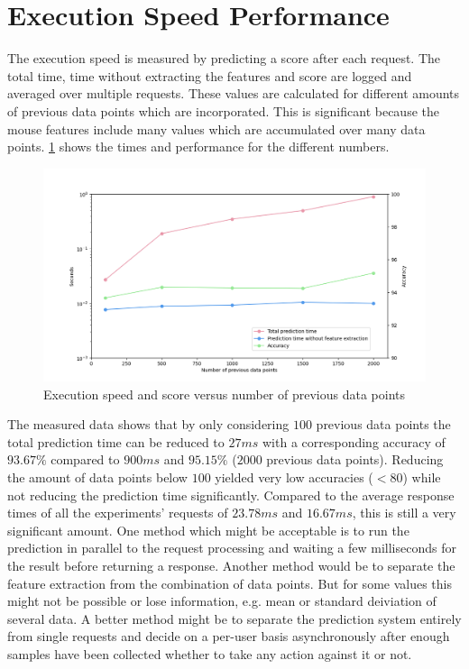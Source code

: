 \documentclass[
    fontsize=12pt,
    headings=small,
    parskip=half,           %
    bibliography=totoc,
    numbers=noenddot,       %
    open=any,               %
    final,                   %
    table
]{scrreprt}
\begin{document}
\section{Execution Speed Performance}

The execution speed is measured by predicting a score after each request. The total time, time without extracting the features and score are logged and averaged over multiple requests. These values are calculated for different amounts of previous data points which are incorporated. This is significant because the mouse features include many values which are accumulated over many data points. \ref{fig:speed_per_dp_count} shows the times and performance for the different numbers.

\begin{figure}[H]
    \includegraphics[width=\textwidth]{figures/speed_per_dp_count.png}
    \caption{Execution speed and score versus number of previous data points}
    \label{fig:speed_per_dp_count}
\end{figure}

The measured data shows that by only considering $100$ previous data points the total prediction time can be reduced to $27ms$ with a corresponding accuracy of $93.67\%$ compared to $900ms$ and $95.15\%$ ($2000$ previous data points). Reducing the amount of data points below $100$ yielded very low accuracies ($<80$) while not reducing the prediction time significantly. Compared to the average response times of all the experiments' requests of $23.78ms$ and $16.67ms$, this is still a very significant amount. One method which might be acceptable is to run the prediction in parallel to the request processing and waiting a few milliseconds for the result before returning a response. Another method would be to separate the feature extraction from the combination of data points. But for some values this might not be possible or lose information, e.g. mean or standard deiviation of several data.
A better method might be to separate the prediction system entirely from single requests and decide on a per-user basis asynchronously after enough samples have been collected whether to take any action against it or not.
\end{document}
